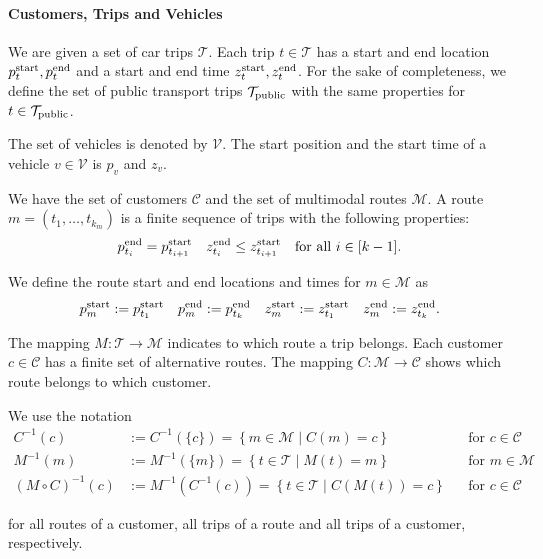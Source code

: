 \paragraph{Customers, Trips and Vehicles} \parfill

We are given a set of car trips $\mathcal{T}$. Each trip $t\in\mathcal{T}$ has a start and end location $p^{\operatorname{start}}_t, p^{\operatorname{end}}_t$ and a start and end time $z^{\operatorname{start}}_t, z^{\operatorname{end}}_t$. For the sake of completeness, we define the set of public transport trips $\mathcal{T}_{\operatorname{public}}$ with the same properties for $t\in\mathcal{T}_{\operatorname{public}}$.

The set of vehicles is denoted by $\mathcal{V}$. The start position and the start time of a vehicle $v\in\mathcal{V}$ is $p_v$ and $z_v$.

We have the set of customers $\mathcal{C}$ and the set of multimodal routes $\mathcal{M}$. A route $m=\left(t_1,\dots,t_{k_m}\right)$ is a finite sequence of trips with the following properties:
\begin{align*}
	p^{\operatorname{end}}_{t_i} = p^{\operatorname{start}}_{t_{i+1}} && z^{\operatorname{end}}_{t_i} \leq z^{\operatorname{start}}_{t_{i+1}} && \text{for all } i\in[k-1].
\end{align*}

We define the route start and end locations and times for $m\in\mathcal{M}$ as
\begin{align*}
	p^{\operatorname{start}}_m := p^{\operatorname{start}}_{t_1} & &  p^{\operatorname{end}}_m := p^{\operatorname{end}}_{t_k} & & z^{\operatorname{start}}_m := z^{\operatorname{start}}_{t_1} & & z^{\operatorname{end}}_m := z^{\operatorname{end}}_{t_k}.
\end{align*}

The mapping $M:\mathcal{T}\to\mathcal{M}$ indicates to which route a trip belongs. Each customer $c\in\mathcal{C}$ has a finite set of alternative routes. The mapping $C:\mathcal{M}\to\mathcal{C}$ shows which route belongs to which customer.

We use the notation
\begin{align*}
	C^{-1}(c) & := C^{-1}\left(\{c\}\right) = \left\{m\in\mathcal{M}\mid C(m)=c\right\} && \text{for } c\in\mathcal{C} \\
	M^{-1}(m) & := M^{-1}\left(\{m\}\right) = \left\{t\in\mathcal{T}\mid M(t)=m\right\} && \text{for } m\in\mathcal{M} \\
	\left(M\circ C\right)^{-1}(c) & := M^{-1}\left(C^{-1}(c)\right) = \left\{t\in\mathcal{T}\mid C\left(M(t)\right)=c\right\} && \text{for } c\in\mathcal{C}
\end{align*}

for all routes of a customer, all trips of a route and all trips of a customer, respectively.

